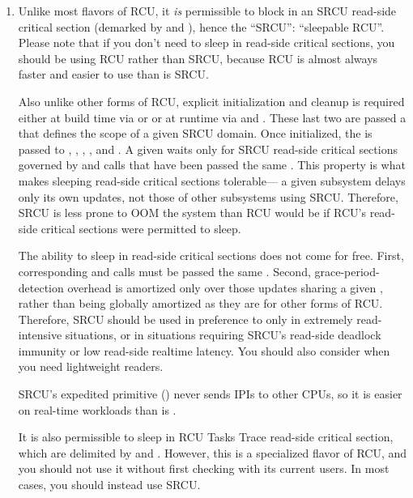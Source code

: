 \begin{enumerate}[start=0]
\item	Unlike most flavors of RCU, it \emph{is} permissible to block in an
	SRCU read-side critical section (demarked by 
	and ), hence the ``SRCU'': ``sleepable RCU''.
	Please note that if you don't need to sleep in read-side critical
	sections, you should be using RCU rather than SRCU, because RCU
	is almost always faster and easier to use than is SRCU\@.

	Also unlike other forms of RCU, explicit initialization and
	cleanup is required either at build time via 
	or  or at runtime via 
	and .
	These last two are passed a
	 that defines the scope of a given
	SRCU domain.
	Once initialized, the  is passed
	to , , ,
	, and .
	A given
	 waits only for SRCU read-side critical
	sections governed by  and 
	calls that have been passed the same .
	This property
	is what makes sleeping read-side critical sections tolerable---%
	a given subsystem delays only its own updates, not those of other
	subsystems using SRCU\@.
	Therefore, SRCU is less prone to OOM the
	system than RCU would be if RCU's read-side critical sections
	were permitted to sleep.

	The ability to sleep in read-side critical sections does not
	come for free.
	First, corresponding  and
	 calls must be passed the same .
	Second, grace-period-detection overhead is amortized only
	over those updates sharing a given , rather than
	being globally amortized as they are for other forms of RCU\@.
	Therefore, SRCU should be used in preference to 
	only in extremely read-intensive situations, or in situations
	requiring SRCU's read-side deadlock immunity or low read-side
	realtime latency.
	You should also consider 
	when you need lightweight readers.

	SRCU's expedited primitive ()
	never sends IPIs to other CPUs, so it is easier on
	real-time workloads than is .

	It is also permissible to sleep in RCU Tasks Trace read-side
	critical section, which are delimited by  and
	.
	However, this is a specialized flavor
	of RCU, and you should not use it without first checking with
	its current users.
	In most cases, you should instead use SRCU\@.


\end{enumerate}
